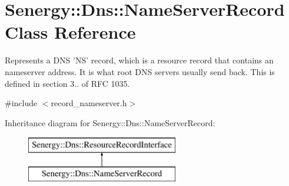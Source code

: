 \hypertarget{class_senergy_1_1_dns_1_1_name_server_record}{\section{Senergy\-:\-:Dns\-:\-:Name\-Server\-Record Class Reference}
\label{class_senergy_1_1_dns_1_1_name_server_record}
}


Represents a D\-N\-S 'N\-S' record, which is a resource record that contains an nameserver address. It is what root D\-N\-S servers usually send back. This is defined in section 3.. of R\-F\-C 1035.  




{\ttfamily \#include $<$record\-\_\-nameserver.\-h$>$}

Inheritance diagram for Senergy\-:\-:Dns\-:\-:Name\-Server\-Record\-:\begin{figure}[H]
\begin{center}
\leavevmode
\includegraphics[height=2.000000cm]{class_senergy_1_1_dns_1_1_name_server_record}
\end{center}
\end{figure}
